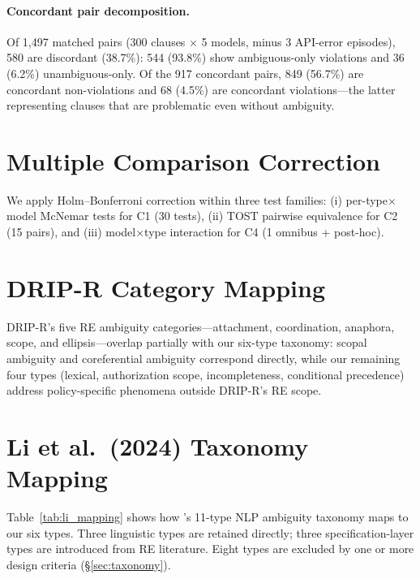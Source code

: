 \paragraph{Concordant pair decomposition.} Of 1{,}497 matched pairs (300 clauses $\times$ 5 models, minus 3 API-error episodes), 580 are discordant (38.7\%): 544 (93.8\%) show ambiguous-only violations and 36 (6.2\%) unambiguous-only. Of the 917 concordant pairs, 849 (56.7\%) are concordant non-violations and 68 (4.5\%) are concordant violations---the latter representing clauses that are problematic even without ambiguity.

\section{Multiple Comparison Correction}
\label{app:multiple_comparison}

We apply Holm--Bonferroni correction within three test families: (i) per-type$\times$model McNemar tests for C1 (30 tests), (ii) TOST pairwise equivalence for C2 (15 pairs), and (iii) model$\times$type interaction for C4 (1 omnibus + post-hoc).

\section{DRIP-R Category Mapping}
\label{app:drip_mapping}

DRIP-R's five RE ambiguity categories---attachment, coordination, anaphora, scope, and ellipsis---overlap partially with our six-type taxonomy: scopal ambiguity and coreferential ambiguity correspond directly, while our remaining four types (lexical, authorization scope, incompleteness, conditional precedence) address policy-specific phenomena outside DRIP-R's RE scope.

\section{Li et al.\ (2024) Taxonomy Mapping}
\label{app:li_mapping}

Table~\ref{tab:li_mapping} shows how \citet{li_ambiguity_taxonomy_2024}'s 11-type NLP ambiguity taxonomy maps to our six types. Three linguistic types are retained directly; three specification-layer types are introduced from RE literature. Eight types are excluded by one or more design criteria (\S\ref{sec:taxonomy}).

